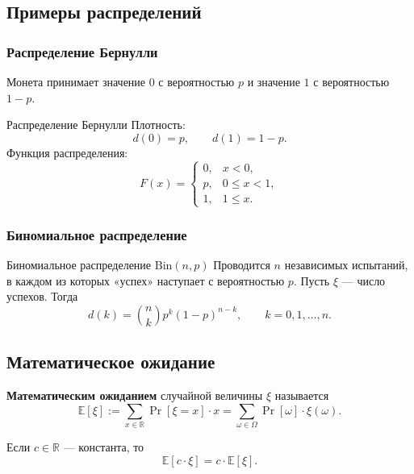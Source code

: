 \subsection{Примеры распределений}

\subsubsection*{Распределение Бернулли}

Монета принимает значение $0$ с вероятностью $p$ и значение $1$ с вероятностью $1-p$.

\begin{Example}{Распределение Бернулли}{}
	Плотность:
	\[
	d(0) = p, \qquad d(1) = 1 - p.
	\]
	Функция распределения:
	\[
	F(x) = \begin{cases}
		0, & x < 0, \\
		p, & 0 \leq x < 1, \\
		1, & 1 \leq x.
	\end{cases}
	\]
\end{Example}

\subsubsection*{Биномиальное распределение}

\begin{Example}{Биномиальное распределение $\mathrm{Bin}(n,p)$}{}
	Проводится $n$ независимых испытаний, в каждом из которых «успех» наступает с вероятностью $p$. Пусть $\xi$ — число успехов. Тогда
	\[
	d(k) = \binom{n}{k} p^k (1-p)^{n-k}, \qquad k = 0, 1, \ldots, n.
	\]
\end{Example}

\subsection{Математическое ожидание}

\begin{Definition}{}{}
	\textbf{Математическим ожиданием} случайной величины $\xi$ называется
	\[
	\mathbb{E}[\xi] := \sum_{x \in \mathbb{R}} \Pr[\xi = x] \cdot x = \sum_{\omega \in \Omega} \Pr[\omega] \cdot \xi(\omega).
	\]
\end{Definition}

\begin{Statement}{}{}
	Если $c \in \mathbb{R}$ — константа, то
	\[
	\mathbb{E}[c \cdot \xi] = c \cdot \mathbb{E}[\xi].
	\]
\end{Statement}

